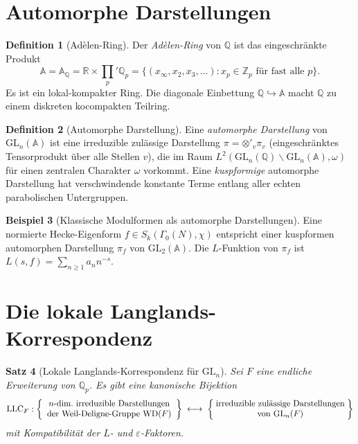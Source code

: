 \documentclass[12pt,a4paper]{amsart}
\newtheorem{theorem}{Satz}[section]
\theoremstyle{definition}
\newtheorem{definition}[theorem]{Definition}
\newtheorem{example}[theorem]{Beispiel}
\newcommand{\Z}{\mathbb{Z}}
\newcommand{\Q}{\mathbb{Q}}
\newcommand{\R}{\mathbb{R}}
\newcommand{\GL}{\mathrm{GL}}
\begin{document}
\section{Automorphe Darstellungen}

\begin{definition}[Adèlen-Ring]
\label{def:adelen}
Der \emph{Adèlen-Ring} von $\Q$ ist das eingeschränkte Produkt
\[
  \mathbb{A} = \mathbb{A}_\Q = \R \times \prod_p{}' \Q_p
  = \bigl\{(x_\infty, x_2, x_3, \ldots) : x_p \in \Z_p \text{ für fast alle } p\bigr\}.
\]
Es ist ein lokal-kompakter Ring.  Die diagonale Einbettung $\Q \hookrightarrow \mathbb{A}$
macht $\Q$ zu einem diskreten kocompakten Teilring.
\end{definition}

\begin{definition}[Automorphe Darstellung]
\label{def:automorphe_darst}
Eine \emph{automorphe Darstellung} von $\GL_n(\mathbb{A})$ ist eine irreduzible
zulässige Darstellung $\pi = \otimes'_v \pi_v$ (eingeschränktes Tensorprodukt über
alle Stellen $v$), die im Raum $L^2(\GL_n(\Q) \backslash \GL_n(\mathbb{A}), \omega)$
für einen zentralen Charakter $\omega$ vorkommt.  Eine \emph{kuspformige} automorphe
Darstellung hat verschwindende konstante Terme entlang aller echten parabolischen
Untergruppen.
\end{definition}

\begin{example}[Klassische Modulformen als automorphe Darstellungen]
Eine normierte Hecke-Eigenform $f \in S_k(\Gamma_0(N), \chi)$ entspricht
einer kuspformen automorphen Darstellung $\pi_f$ von $\GL_2(\mathbb{A})$.
Die $L$-Funktion von $\pi_f$ ist $L(s, f) = \sum_{n \ge 1} a_n n^{-s}$.
\end{example}

\section{Die lokale Langlands-Korrespondenz}

\begin{theorem}[Lokale Langlands-Korrespondenz für $\GL_n$]
\label{thm:lokale_langlands}
Sei $F$ eine endliche Erweiterung von $\Q_p$.  Es gibt eine kanonische Bijektion
\[
  \mathrm{LLC}_F :
  \left\{\parbox{5.5cm}{\centering $n$-dim.\ irreduzible Darstellungen
  der Weil-Deligne-Gruppe $\mathrm{WD}(F)$}\right\}
  \;\longleftrightarrow\;
  \left\{\parbox{5.5cm}{\centering irreduzible zulässige Darstellungen von $\GL_n(F)$}\right\}
\]
mit Kompatibilität der $L$- und $\varepsilon$-Faktoren.
\end{theorem}
\end{document}

